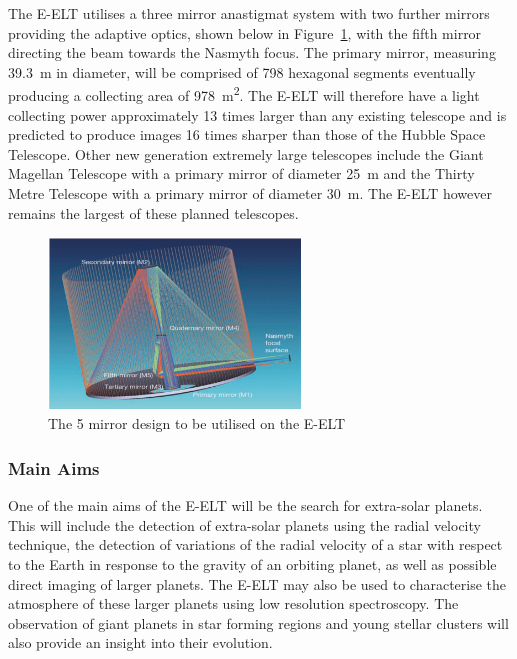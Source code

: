 	The E-ELT utilises a three mirror anastigmat system with two further mirrors providing the adaptive optics, shown below in Figure~\ref{fig:5_mirror_eelt}, with the fifth mirror directing the beam towards the Nasmyth focus\cite[p.~16]{E_ELT_Construction_Proposal}. The primary mirror, measuring \SI{39.3}{\metre} in diameter, will be comprised of 798 hexagonal segments eventually producing a collecting area of \SI{978}{\square\metre}. The E-ELT will therefore have a light collecting power approximately 13 times larger than any existing telescope and is predicted to produce images 16 times sharper than those of the Hubble Space Telescope. Other new generation extremely large telescopes include the Giant Magellan Telescope with a primary mirror of diameter \SI{25}{\metre} and the Thirty Metre Telescope with a primary mirror of diameter \SI{30}{\metre}. The E-ELT however remains the largest of these planned telescopes.
	\begin{figure}[!htbp]
		\centering
		\includegraphics[width=0.6\textwidth]{../Images/Anastigmat.png}
		\caption{The 5 mirror design to be utilised on the E-ELT}\label{fig:5_mirror_eelt}
	\end{figure}

	\subsubsection{Main Aims} %
	\label{ssub:main_aims}
		One of the main aims of the E-ELT will be the search for extra-solar planets.  This will include the detection of extra-solar planets using the radial velocity technique, the detection of variations of the radial velocity of a star with respect to the Earth in response to the gravity of an orbiting planet, as well as possible direct imaging of larger planets. The E-ELT may also be used to characterise the atmosphere of these larger planets using low resolution spectroscopy. The observation of giant planets in star forming regions and young stellar clusters will also provide an insight into their evolution.

